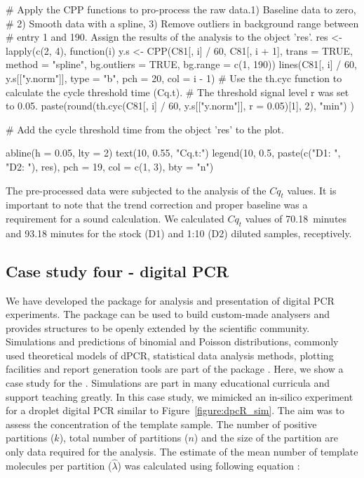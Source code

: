 \begin{example}
  # Apply the CPP functions to pro-process the raw data.1) Baseline data to 
zero, 
  # 2) Smooth data with a spline, 3) Remove outliers in background range 
between 
  # entry 1 and 190. Assign the results of the analysis to the object 'res'.
res <- lapply(c(2, 4), function(i) {
  y.s <- CPP(C81[, i] / 60, C81[, i + 1],
             trans = TRUE, 
             method = "spline",
             bg.outliers = TRUE,
             bg.range = c(1, 190))
  lines(C81[, i] / 60, y.s[["y.norm"]], type = "b", pch = 20, col = i - 1)
  # Use the th.cyc function to calculate the cycle threshold time (Cq.t). 
  # The threshold signal level r was set to 0.05.
  paste(round(th.cyc(C81[, i] / 60, y.s[["y.norm"]], r = 0.05)[1], 2), "min")
})

# Add the cycle threshold time from the object 'res' to the plot.

abline(h = 0.05, lty = 2)
text(10, 0.55, "Cq.t:")
legend(10, 0.5, paste(c("D1: ", "D2: "), res), pch = 19, col = c(1, 3), 
       bty = "n")
\end{example}

The pre-processed data were subjected to the analysis of the $Cq_{t}$ values. 
It is important to note that the trend correction and proper baseline was a 
requirement for a sound calculation. We calculated $Cq_{t}$ values of 
70.18~minutes and 93.18 minutes for the stock (D1) and 1:10 (D2) diluted 
samples, receptively.

\subsection{Case study four - digital PCR}

We have developed the  package for analysis and presentation of 
digital PCR experiments. The  package can be used to build 
custom-made analysers and provides structures to be openly extended by the 
scientific community. Simulations and predictions of binomial and Poisson 
distributions, commonly used theoretical models of dPCR, statistical data 
analysis methods, plotting facilities and report generation tools are part of 
the package \citep{pabinger_2014}. Here, we show a case study for the 
. Simulations are part in many educational curricula and support 
teaching greatly. In this case study, we mimicked an in-silico experiment for a 
droplet digital PCR similar to Figure~\ref{figure:dpcR_sim}. The aim was to 
assess the concentration of the template sample. The number of positive 
partitions ($k$), total number of partitions ($n$) and the size of the 
partition 
are only data required for the analysis. The estimate of the mean number of 
template molecules per partition ($\hat \lambda$) was calculated using 
following 
equation \citep{huggett_2013}:

